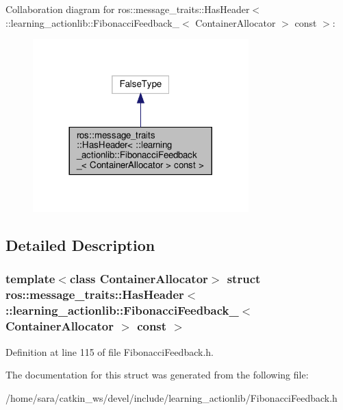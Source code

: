 Collaboration diagram for ros\+:\+:message\+\_\+traits\+:\+:Has\+Header$<$ \+:\+:learning\+\_\+actionlib\+:\+:Fibonacci\+Feedback\+\_\+$<$ Container\+Allocator $>$ const $>$\+:
\nopagebreak
\begin{figure}[H]
\begin{center}
\leavevmode
\includegraphics[width=236pt]{structros_1_1message__traits_1_1HasHeader_3_01_1_1learning__actionlib_1_1FibonacciFeedback___3_0c5b3e9176c930abfba7a1794efe5caee}
\end{center}
\end{figure}


\subsection{Detailed Description}
\subsubsection*{template$<$class Container\+Allocator$>$\newline
struct ros\+::message\+\_\+traits\+::\+Has\+Header$<$ \+::learning\+\_\+actionlib\+::\+Fibonacci\+Feedback\+\_\+$<$ Container\+Allocator $>$ const $>$}



Definition at line 115 of file Fibonacci\+Feedback.\+h.



The documentation for this struct was generated from the following file\+:\begin{DoxyCompactItemize}
\item 
/home/sara/catkin\+\_\+ws/devel/include/learning\+\_\+actionlib/Fibonacci\+Feedback.\+h\end{DoxyCompactItemize}
